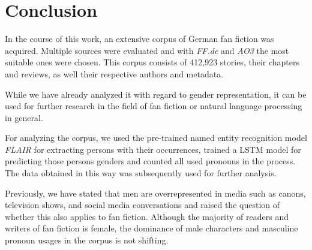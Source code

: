 \chapter{Conclusion}\label{ch:conclusion}



In the course of this work, an extensive corpus of German fan fiction was acquired.
Multiple sources were evaluated and with \emph{FF.de} and \emph{AO3} the most suitable ones were chosen.
This corpus consists of 412,923 stories, their chapters and reviews, as well their respective authors and metadata.

While we have already analyzed it with regard to gender representation, it can be used for further research in the field of fan fiction or natural language processing in general.

For analyzing the corpus, we used the pre-trained named entity recognition model \emph{FLAIR} for extracting persons with their occurrences, trained a LSTM model for predicting those persons genders and counted all used pronouns in the process.
The data obtained in this way was subsequently used for further analysis.

Previously, we have stated that men are overrepresented in media such as canons, television shows, and social media conversations and raised the question of whether this also applies to fan fiction.
Although the majority of readers and writers of fan fiction is female, the dominance of male characters and masculine pronoun usages in the corpus is not shifting.


